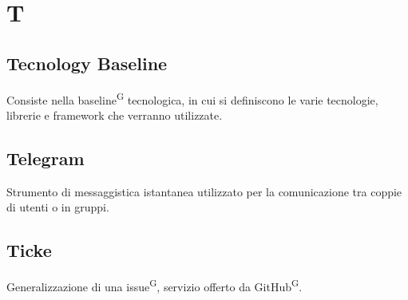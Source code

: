 \section{T}

\subsection{Tecnology Baseline}
Consiste nella baseline\textsuperscript{G} tecnologica, in cui si definiscono le varie tecnologie, librerie e framework che verranno utilizzate.


\subsection{Telegram}
Strumento di messaggistica istantanea utilizzato per la comunicazione tra coppie di utenti o in gruppi.



\subsection{Ticke}
Generalizzazione di una issue\textsuperscript{G}, servizio offerto da GitHub\textsuperscript{G}.





\clearpage